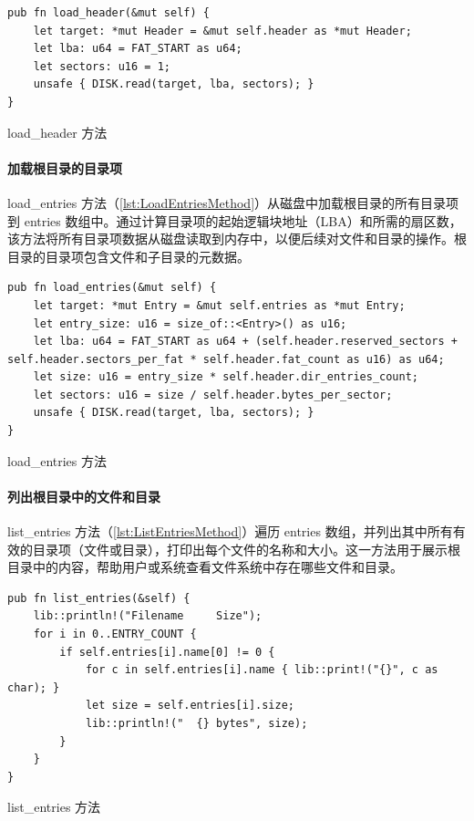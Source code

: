 \begin{listing}[htbp]
    \begin{verbatim}
pub fn load_header(&mut self) {
    let target: *mut Header = &mut self.header as *mut Header;
    let lba: u64 = FAT_START as u64;
    let sectors: u16 = 1;
    unsafe { DISK.read(target, lba, sectors); }
}
    \end{verbatim}
    \caption{load\_header 方法}\label{lst:LoadHeaderMethod}
\end{listing}

\paragraph{加载根目录的目录项}

load\_entries 方法（\cref{lst:LoadEntriesMethod}）从磁盘中加载根目录的所有目录项到 entries 数组中。通过计算目录项的起始逻辑块地址（LBA）和所需的扇区数，该方法将所有目录项数据从磁盘读取到内存中，以便后续对文件和目录的操作。根目录的目录项包含文件和子目录的元数据。

\begin{listing}[htbp]
    \begin{verbatim}
pub fn load_entries(&mut self) {
    let target: *mut Entry = &mut self.entries as *mut Entry;
    let entry_size: u16 = size_of::<Entry>() as u16;
    let lba: u64 = FAT_START as u64 + (self.header.reserved_sectors + self.header.sectors_per_fat * self.header.fat_count as u16) as u64;
    let size: u16 = entry_size * self.header.dir_entries_count;
    let sectors: u16 = size / self.header.bytes_per_sector;
    unsafe { DISK.read(target, lba, sectors); }
}
    \end{verbatim}
    \caption{load\_entries 方法}\label{lst:LoadEntriesMethod}
\end{listing}

\paragraph{列出根目录中的文件和目录}

list\_entries 方法（\cref{lst:ListEntriesMethod}）遍历 entries 数组，并列出其中所有有效的目录项（文件或目录），打印出每个文件的名称和大小。这一方法用于展示根目录中的内容，帮助用户或系统查看文件系统中存在哪些文件和目录。

\begin{listing}[htbp]
    \begin{verbatim}
pub fn list_entries(&self) {
    lib::println!("Filename     Size");
    for i in 0..ENTRY_COUNT {
        if self.entries[i].name[0] != 0 {
            for c in self.entries[i].name { lib::print!("{}", c as char); }
            let size = self.entries[i].size;
            lib::println!("  {} bytes", size);
        }
    }
}
    \end{verbatim}
    \caption{list\_entries 方法}\label{lst:ListEntriesMethod}
\end{listing}


